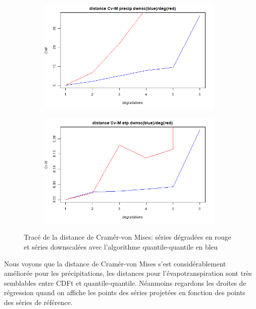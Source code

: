 \documentclass[a4paper,11pt]{article}
\numberwithin{equation}{section}
\begin{document}
\begin{figure}[H]
 	\centering
 	\begin{subfigure}[b]{0.45\textwidth}
 		\includegraphics[scale=0.38]{images/Dist_CVM_precip_QQ.png}
 	\end{subfigure}
	\hfill
	\begin{subfigure}[b]{0.45\textwidth}
		\includegraphics[scale=0.38]{images/Dist_CVM_evap_QQ.png}
	\end{subfigure}
 	\caption{Tracé de la distance de Cramér-von Mises: séries dégradées en rouge et séries downscalées avec l'algorithme quantile-quantile en bleu}
 	\label{fig-res_CVM_QQ}
\end{figure}

Nous voyons que la distance de Cramér-von Mises s'est considérablement améliorée pour les précipitations, les distances pour l'évapotranspiration sont très semblables entre CDFt et quantile-quantile. Néanmoins regardons les droites de régression quand on affiche les points des séries projetées en fonction des points des séries de référence. 
\end{document}
